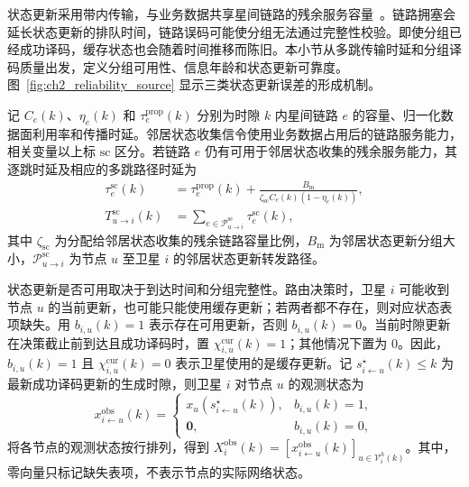 状态更新采用带内传输，与业务数据共享星间链路的残余服务容量~\cite{chuai-ResourceAllocation-TON19}。链路拥塞会延长状态更新的排队时间，链路误码可能使分组无法通过完整性校验。即使分组已经成功译码，缓存状态也会随着时间推移而陈旧。本小节从多跳传输时延和分组译码质量出发，定义分组可用性、信息年龄和状态更新可靠度。图~\ref{fig:ch2_reliability_source} 显示三类状态更新误差的形成机制。

记 $C_e(k)$、$\eta_e(k)$ 和 $\tau_e^{\mathrm{prop}}(k)$ 分别为时隙 $k$ 内星间链路 $e$ 的容量、归一化数据面利用率和传播时延。邻居状态收集信令使用业务数据占用后的链路服务能力，相关变量以上标 $\mathrm{sc}$ 区分。若链路 $e$ 仍有可用于邻居状态收集的残余服务能力，其逐跳时延及相应的多跳路径时延为
\begin{equation}
\begin{aligned}
\tau_e^{\mathrm{sc}}(k)
&=
\tau_e^{\mathrm{prop}}(k)
+
\frac{B_{\mathrm m}}
{\zeta_{\mathrm{sc}} C_e(k)\left(1-\eta_e(k)\right)},
\\
T_{u\rightarrow i}^{\mathrm{sc}}(k)
&=
\sum_{e\in\mathcal P_{u\rightarrow i}^{\mathrm{sc}}}
\tau_e^{\mathrm{sc}}(k),
\end{aligned}
\label{eq:ch2_state_update_delay}
\end{equation}
其中 $\zeta_{\mathrm{sc}}$ 为分配给邻居状态收集的残余链路容量比例，$B_{\mathrm m}$ 为邻居状态更新分组大小，$\mathcal P_{u\rightarrow i}^{\mathrm{sc}}$ 为节点 $u$ 至卫星 $i$ 的邻居状态更新转发路径。

状态更新是否可用取决于到达时间和分组完整性。路由决策时，卫星 $i$ 可能收到节点 $u$ 的当前更新，也可能只能使用缓存更新；若两者都不存在，则对应状态表项缺失。用 $b_{i,u}(k)=1$ 表示存在可用更新，否则 $b_{i,u}(k)=0$。当前时隙更新在决策截止前到达且成功译码时，置 $\chi_{i,u}^{\mathrm{cur}}(k)=1$；其他情况下置为 $0$。因此，$b_{i,u}(k)=1$ 且 $\chi_{i,u}^{\mathrm{cur}}(k)=0$ 表示卫星使用的是缓存更新。记 $s_{i\leftarrow u}^{\star}(k)\le k$ 为最新成功译码更新的生成时隙，则卫星 $i$ 对节点 $u$ 的观测状态为
\begin{equation}
x_{i\leftarrow u}^{\mathrm{obs}}(k)
=
\begin{cases}
x_u(s_{i\leftarrow u}^{\star}(k)), & b_{i,u}(k)=1,\\
\mathbf 0, & b_{i,u}(k)=0,
\end{cases}
\label{eq:ch2_observed_state}
\end{equation}
将各节点的观测状态按行排列，得到 $X_i^{\mathrm{obs}}(k)=[x_{i\leftarrow u}^{\mathrm{obs}}(k)]_{u\in\mathcal V_i^h(k)}$。其中，零向量只标记缺失表项，不表示节点的实际网络状态。

